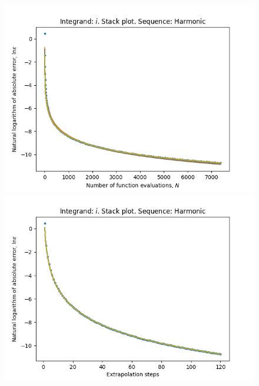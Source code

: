 \begin{figure}[H]
\centering
\begin{minipage}{0.45\textwidth}
\centering
\includegraphics[scale=0.45]{../results/romberg_plots/circle_area_hp_harmonic_stack.png}
\end{minipage}
\begin{minipage}{0.45\textwidth}
\centering
\includegraphics[scale=0.45]{../results/romberg_plots/circle_area_hp_harmonic_steps_stack.png}
\end{minipage}
\end{figure}

